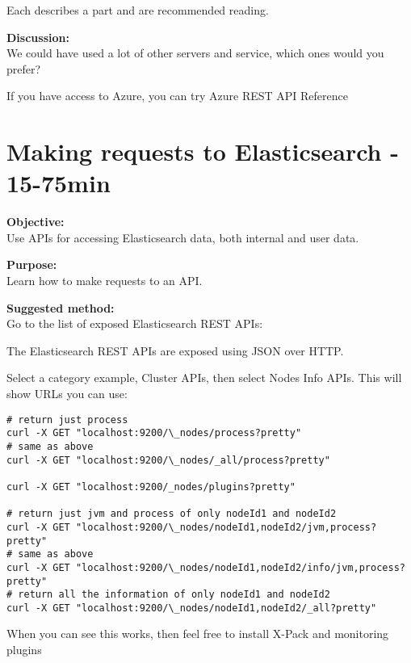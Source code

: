 \documentclass[a4paper,11pt,notitlepage]{report}
\begin{document}
Each describes a part and are recommended reading.

{\bf Discussion:}\\
We could have used a lot of other servers and service, which ones would you prefer?

If you have access to Azure, you can try Azure REST API Reference\\ 

\chapter{Making requests to Elasticsearch - 15-75min}
\label{ex:es-rest-api}


{\bf Objective:}\\
Use APIs for accessing Elasticsearch data, both internal and user data.

{\bf Purpose:}\\
Learn how to make requests to an API.

{\bf Suggested method:}\\
Go to the list of exposed Elasticsearch REST APIs:\\

The Elasticsearch REST APIs are exposed using JSON over HTTP.

Select a category example, Cluster APIs, then select Nodes Info APIs. This will show URLs you can use:

\begin{verbatim}
# return just process
curl -X GET "localhost:9200/\_nodes/process?pretty"
# same as above
curl -X GET "localhost:9200/\_nodes/_all/process?pretty"

curl -X GET "localhost:9200/_nodes/plugins?pretty"

# return just jvm and process of only nodeId1 and nodeId2
curl -X GET "localhost:9200/\_nodes/nodeId1,nodeId2/jvm,process?pretty"
# same as above
curl -X GET "localhost:9200/\_nodes/nodeId1,nodeId2/info/jvm,process?pretty"
# return all the information of only nodeId1 and nodeId2
curl -X GET "localhost:9200/\_nodes/nodeId1,nodeId2/_all?pretty"
\end{verbatim}

When you can see this works, then feel free to install X-Pack and monitoring plugins
\end{document}
